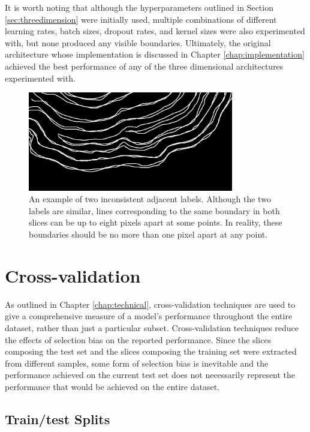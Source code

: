 It is worth noting that although the hyperparameters outlined in Section \ref{sec:threedimension} were initially used, multiple combinations of different learning rates, batch sizes, dropout rates, and kernel sizes were also experimented with, but none produced any visible boundaries. Ultimately, the original architecture whose implementation is discussed in Chapter \ref{chap:implementation} achieved the best performance of any of the three dimensional architectures experimented with.

\begin{figure}[t]
    \centering
    \includegraphics[width=0.8\textwidth]{images/3D-label-example.png}
    \caption{An example of two inconsistent adjacent labels. Although the two labels are similar, lines corresponding to the same boundary in both slices can be up to eight pixels apart at some points. In reality, these boundaries should be no more than one pixel apart at any point.}
    \label{fig:3dlabel}
\end{figure}

\section{Cross-validation}
\label{sec:evalcrossval}

As outlined in Chapter \ref{chap:technical}, cross-validation techniques are used to give a comprehensive measure of a model's performance throughout the entire dataset, rather than just a particular subset. Cross-validation techniques reduce the effects of selection bias on the reported performance. Since the slices composing the test set and the slices composing the training set were extracted from different samples, some form of selection bias is inevitable and the performance achieved on the current test set does not necessarily represent the performance that would be achieved on the entire dataset.

\subsection{Train/test Splits}


